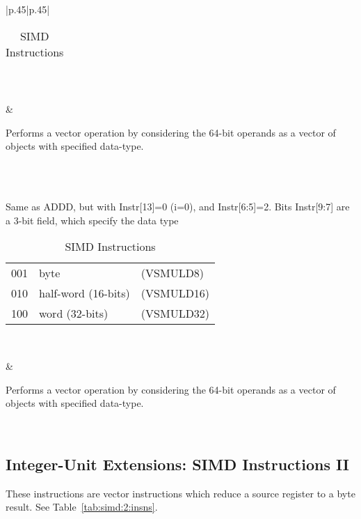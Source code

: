 \documentclass{book}
\begin{document}
\begin{table}[p]
\begin{tabular}[p]{|p{.45\textwidth}|p{.45\textwidth}|}
{\begin{tabular}[p]{|l|l|l|}
\hline
\end{tabular}\\
} & 
 \parbox{\linewidth}{	Performs a vector operation by considering the 64-bit operands as a vector of objects with specified data-type.}\\
\hline
\hline
{} \\ 
 \hline 
 \parbox{\linewidth}{        Same as ADDD, but with Instr[13]=0 (i=0),
    and Instr[6:5]=2. Bits Instr[9:7] are a 3-bit field, which specify
    the data type\\
\begin{tabular}[p]{|l|l|l|}
\hline
  001  &   byte			 & (VSMULD8)\\
  010  &   half-word (16-bits)	 & (VSMULD16)\\
  100  &   word (32-bits) 		 & (VSMULD32)\\
\hline
\end{tabular}\\
} & 
 \parbox{\linewidth}{	Performs a vector operation by considering the 64-bit operands as a vector of objects with specified data-type.}\\
\hline
  \end{tabular}
  \caption{SIMD Instructions}
  \label{tab:simd:insns}
\end{table}

\subsection{Integer-Unit Extensions: SIMD Instructions II}
\label{sec:integer-unit-extns:simd-instructions:2}

These  instructions  are vector  instructions  which  reduce a  source
register to a byte result.  See Table~\ref{tab:simd:2:insns}.
\end{document}
